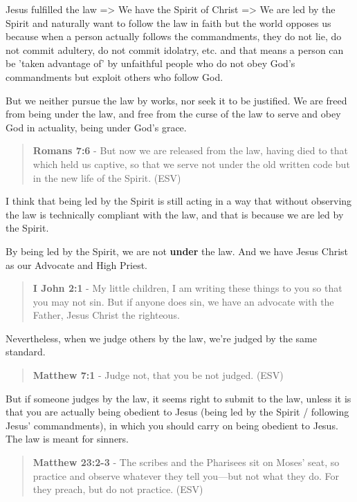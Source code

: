 \documentclass[11pt]{article}
\begin{document}
Jesus fulfilled the law => We have the Spirit of Christ => We are led by the Spirit and naturally want to follow the law in faith but the world opposes us because when a person actually follows the commandments, they do not lie, do not commit adultery, do not commit idolatry, etc. and that means a person can be 'taken advantage of' by unfaithful people who do not obey God's commandments but exploit others who follow God.

But we neither pursue the law by works, nor seek it to be justified.
We are freed from being under the law, and free from the curse of the law to serve and obey God in actuality, being under God's grace.

\begin{quote}
\textbf{Romans 7:6} - But now we are released from the law, having died to that which held us captive, so that we serve not under the old written code but in the new life of the Spirit. (ESV)
\end{quote}

I think that being led by the Spirit is still acting in a way that without observing the law is technically compliant with the law, and that is because we are led by the Spirit.

By being led by the Spirit, we are not \textbf{under} the law. And we have Jesus Christ as our Advocate and High Priest.

\begin{quote}
\textbf{I John 2:1} - My little children, I am writing these things to you so that you may not sin. But if anyone does sin, we have an advocate with the Father, Jesus Christ the righteous.
\end{quote}

Nevertheless, when we judge others by the law, we're judged by the same standard.

\begin{quote}
\textbf{Matthew 7:1} - Judge not, that you be not judged. (ESV)
\end{quote}

But if someone judges by the law, it seems right to submit to the law, unless it is that you are actually being obedient to Jesus (being led by the Spirit / following Jesus' commandments), in which you should carry on being obedient to Jesus. The law is meant for sinners.

\begin{quote}
\textbf{Matthew 23:2-3} - The scribes and the Pharisees sit on Moses' seat, so practice and observe whatever they tell you—but not what they do. For they preach, but do not practice. (ESV)
\end{quote}
\end{document}
